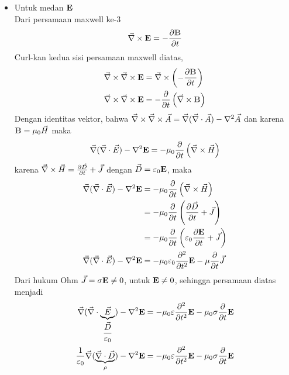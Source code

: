 \begin{itemize}[leftmargin=*]
    \item Untuk medan $\vE$\\
        Dari persamaan maxwell ke-3
        \begin{equation*}
            \vnabla \times \vE = -\frac{\partial \vB}{\partial t}
        \end{equation*}
        Curl-kan kedua sisi persamaan maxwell diatas,
        \begin{align*}
            \vnabla \times \vnabla \times \vE &= \vnabla \times \left(-\frac{\partial \vB}{\partial t}\right)\\
            \vnabla \times \vnabla \times \vE &=  -\frac{\partial}{\partial t}\left(\vnabla \times \vB \right) 
        \end{align*}
        Dengan identitas vektor, bahwa $\vec{\nabla} \times \vec{\nabla} \times \vec{A}=\vec{\nabla}(\vec{\nabla}\cdot\vec{A})-\nabla^2 \vec{A}$ dan karena $\vB = \mu_0 \vH$ maka
        \begin{align*}
            \vnabla(\vnabla\cdot\vec{E})-\nabla^2\vE=-\mu_0 \frac{\partial }{\partial t}\left(\vnabla \times \vH\right) 
        \end{align*}
        karena $\vec{\nabla} \times \vec{H} = \frac{\partial \vec{D}}{\partial t} + \vec{J}$ dengan $\vD = \epsilon_0 \vE$, maka
        \begin{align*}
            \vnabla(\vnabla\cdot\vec{E})-\nabla^2\vE&=-\mu_0 \frac{\partial }{\partial t}\left(\vnabla \times \vH\right)\\
            &=-\mu_0 \frac{\partial }{\partial t}\left(\frac{\partial \vD}{\partial t}+\vJ\right) \\
            &=-\mu_0 \frac{\partial }{\partial t}\left(\epsilon_0\frac{\partial \vE}{\partial t}+\vJ\right) \\
            \vnabla(\vnabla\cdot\vec{E})-\nabla^2\vE&=-\mu_0\epsilon_0 \frac{\partial^2 }{\partial t^2}\vE-\mu \frac{\partial }{\partial t}\vJ
        \end{align*}
        Dari hukum Ohm $\vJ=\sigma \vE \neq 0$, untuk $\vE\neq 0$, sehingga persamaan diatas menjadi
        \begin{align*}
            \vnabla(\vnabla\cdot\underbrace{\vec{E}}_{\dfrac{\vD}{\epsilon_0}})-\nabla^2\vE&=-\mu_0\epsilon \frac{\partial^2 }{\partial t^2}\vE-\mu_0\sigma \frac{\partial }{\partial t}\vE\\
            \frac{1}{\epsilon_0}\vnabla(\underbrace{\vnabla\cdot\vD}_{\rho})-\nabla^2\vE&=-\mu_0\epsilon \frac{\partial^2 }{\partial t^2}\vE-\mu_0\sigma \frac{\partial }{\partial t}\vE

\end{align*}
\end{itemize}
